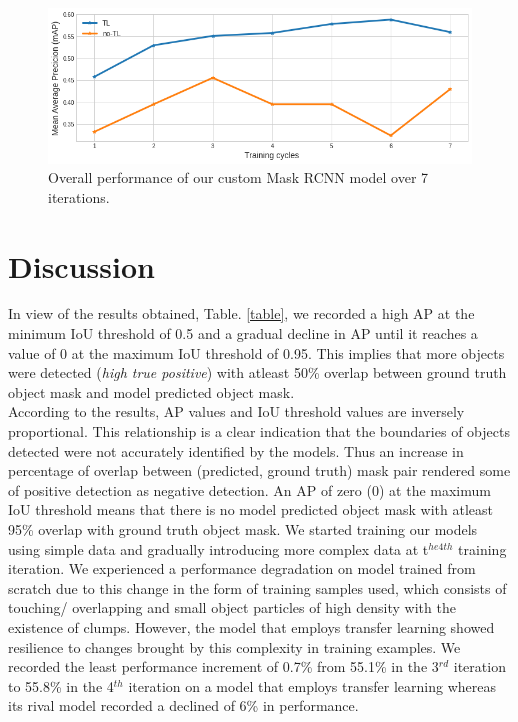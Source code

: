 \documentclass[conference]{IEEEtran}
\begin{document}
		\begin{figure}[htbp]
			\centering
			\includegraphics[width=1\linewidth]{mAP-cycles.png}
			\caption{Overall performance of our custom Mask RCNN model over 7 iterations.}
			\label{mAP-cycles}
		\end{figure}
	

\section{Discussion}
	
	In view of the results obtained, Table. \ref{table}, we recorded a high AP at the minimum IoU threshold of 0.5 and a gradual decline in AP until it reaches a value of 0 at the maximum
 IoU threshold of 0.95. This implies that more objects were detected (\textit{high true positive}) with
 atleast 50\% overlap between ground truth object mask and model predicted object mask.\\
		
	According to the results, AP values and IoU threshold values are inversely proportional. This relationship is a clear indication that the boundaries of objects detected were not accurately identified by the models. Thus an increase in percentage of overlap between (predicted, ground truth) mask pair rendered some of positive detection as negative detection. An AP of zero (0) at the maximum IoU threshold means that there is no model predicted object mask with atleast 95\% overlap with ground truth object mask. We started training our models using simple data and gradually introducing more complex data at t$ ^{he 4th} $ training iteration. We experienced a performance degradation on model
trained from scratch due to this change in the form of training samples used, which consists of touching/ overlapping and small object particles of high density with the existence of clumps. However, the model that employs transfer learning showed resilience to changes brought by this complexity in training examples. We recorded the least performance increment of 0.7\% from 55.1\% in the 3$ ^{rd} $ iteration to 55.8\% in the 4$ ^{th} $ iteration on a model that
employs transfer learning whereas its rival model recorded a declined of 6\% in performance.\\
	
\end{document}
